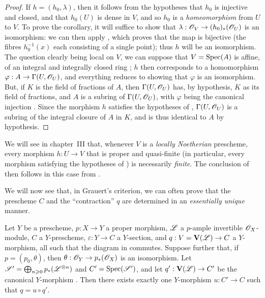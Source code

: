 \begin{proof}
\label{proof-2.8.11.2}
If $h=(h_0,\lambda)$, then it follows from the hypotheses that $h_0$ is injective and closed, and that $h_0(U)$
is dense in $V$, and so $h_0$ is a \emph{homeomorphism} from $U$ to $V$.
To prove the corollary, it will suffice to show that $\lambda:\sh{O}_V\to(h_0)_*(\sh{O}_U)$ is an isomorphism: we can then apply , which proves that the map  is bijective (the fibres $h_0^{-1}(x)$ each consisting of a single point);
thus $h$ will be an isomorphism.
The question clearly being local on $V$, we can suppose that $V=\operatorname{Spec}(A)$ is affine, of an integral and integrally closed ring ;
$h$ then corresponds  to a homomorphism $\varphi:A\to\Gamma(U,\sh{O}_U)$, and everything reduces to showing that $\varphi$ is an isomorphism.
But, if $K$ is the field of fractions of $A$, then $\Gamma(U,\mathscr{O}_U)$ has, by hypothesis, $K$ as its field of fractions, and $A$ is a subring of $\Gamma(U,\mathscr{O}_U)$, with $\varphi$ being the canonical injection .
Since the morphism $h$ satisfies the hypotheses of , $\Gamma(U,\mathscr{O}_U)$ is a subring of the integral closure of $A$ in $K$, and is thus identical to $A$ by hypothesis.
\end{proof}

\begin{remark}[8.11.3]
\label{II.8.11.3}
We will see in chapter~III  that, whenever $V$ is a \emph{locally Noetherian} prescheme, every morphism $h:U\to V$ that is proper and quasi-finite (in particular, every morphism satisfying the hypotheses of ) is necessarily \emph{finite}.
The conclusion of  then follows in this case from .
\end{remark}

\begin{env}[8.11.4]
\label{II.8.11.4}
We will now see that, in Grauert's criterion, we can often prove that the prescheme $C$ and the ``contraction'' $q$ are determined in an \emph{essentially unique} manner.
\end{env}

\begin{lemma}[8.11.5]
\label{II.8.11.5}
Let $Y$ be a prescheme, $p:X\to Y$ a proper morphism, $\mathscr{L}$ a $p$-ample invertible $\mathscr{O}_X$-module, $C$ a $Y$-prescheme, $\varepsilon:Y\to C$ a $Y$-section, and $q:V=\bb{V}(\sh{L})\to C$ a $Y$-morphism, all such that the diagram in  commutes.
Suppose further that, if $p=(p_0,\theta)$, then $\theta:\sh{O}_Y\to p_*(\sh{O}_X)$ is an isomorphism.
Let $\mathscr{S}'=\bigoplus_{n\geqslant0}p_*(\mathscr{L}^{\otimes n})$ and $C'=\operatorname{Spec}(\mathscr{S}')$, and let $q':\bb{V}(\sh{L})\to C'$ be the canonical $Y$-morphism .
Then there exists exactly one $Y$-morphism $u:C'\to C$ such that $q=u\circ q'$.
\end{lemma}

